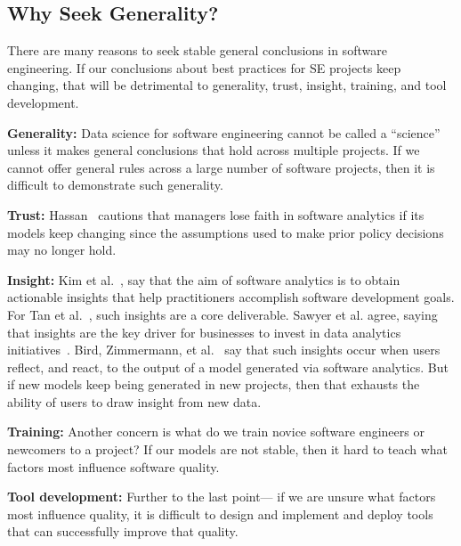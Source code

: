 \documentclass[10pt,journal,compsoc]{IEEEtran}
\begin{document}
\subsection{Why Seek Generality?}
\label{sec:Motivation}
There are many reasons to seek stable general conclusions in software engineering. If our conclusions about best practices for SE projects keep changing, that will be detrimental to generality, trust, insight, training, and tool development.

\textbf{Generality:} Data science for software engineering cannot be called a ``science'' unless it makes general conclusions that hold across  multiple  projects. If we cannot offer general rules across a large number of software projects, then it is   difficult to demonstrate such generality.

\textbf{Trust:} Hassan~\cite{Hassan17} cautions that managers lose faith in software analytics if its models keep changing since  the assumptions used to make prior policy decisions may no longer hold.

\textbf{Insight:} Kim et al.~\cite{Kim2016}, say  that the aim of software analytics is to obtain actionable insights that help practitioners accomplish software development goals. For Tan et al.~\cite{tan2016defining}, such   insights  are a core deliverable. Sawyer et al. agree, saying that  insights are the key driver for businesses to invest in data analytics initiatives~\cite{sawyer2013bi}. Bird, Zimmermann, et al.~\cite{Bird:2015} say that such  insights occur when users reflect, and react, to the output of a model generated via software analytics. But if  new models keep being generated in new projects, then that exhausts the ability of  users to draw insight from  new data.

\textbf{Training:} Another concern is what do we train novice software engineers or newcomers to a project? If our models are not stable, then it hard to teach what factors  most influence software quality.

\textbf{Tool development:} Further to the last point--- if we are unsure what factors most influence quality, it is difficult to design and implement and deploy tools that can successfully improve that quality.
\end{document}
